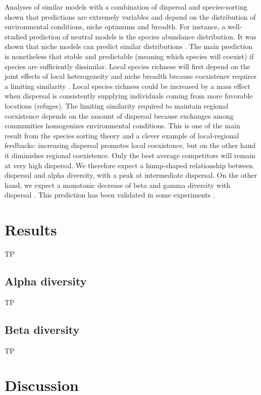 \documentclass[12pt]{article}
\begin{document}
Analyses of similar models with a combination of dispersal and species-sorting shown that predictions are extremely variables and depend on the distribution of environmental conditions, niche optimums and breadth. For instance, a well-studied prediction of neutral models is the species abundance distribution. It was shown that niche models can predict similar distributions \parencite{Tilman2004,Gravel2006}. The main prediction is nonetheless that stable and predictable (meaning which species will coexist) if species are sufficiently dissimilar. Local species richness will first depend on the joint effects of local heterogeneity and niche breadth because coexistence requires a limiting similarity \parencite{Schwilk2005}. Local species richness could be increased by a mass effect when dispersal is consistently supplying individuals coming from more favorable locations (refuges). The limiting similarity required to maintain regional coexistence depends on the amount of dispersal because exchanges among communities homogenizes environmental conditions. This is one of the main result from the species sorting theory and a clever example of local-regional feedbacks: increasing dispersal promotes local coexistence, but on the other hand it diminishes regional coexistence. Only the best average competitors will remain at very high dispersal.  We therefore expect a hump-shaped relationship between dispersal and alpha diversity, with a peak at intermediate dispersal. On the other hand, we expect a monotonic decrease of beta and gamma diversity with dispersal \parencite{Mouquet2003}. This prediction has been validated in some experiments \parencite{Venail2008, Logue2011}.

\section*{Results}
TP

\subsection*{Alpha diversity}
TP

\subsection*{Beta diversity} 
TP



\section*{Discussion}
\end{document}
